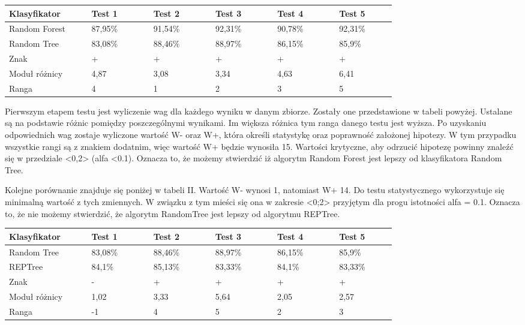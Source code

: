 \documentclass[conference]{IEEEtran}
\begin{document}
\begin{table}[H]

	\begin{tabular}{|p{0.16\linewidth}|p{0.12\linewidth}|p{0.12\linewidth}|p{0.12\linewidth}|p{0.12\linewidth}|p{0.11\linewidth}|}%
	\hline\centering
	Klasyfikator 	& Test 1 & Test 2 & Test 3 & Test 4 & Test 5 \\ \hline\centering
	Random Forest	& 87,95\% & 91,54\% & 92,31\% & 90,78\% & 92,31\% \\ \hline\centering
	Random Tree	& 83,08\% & 88,46\% & 88,97\% & 86,15\% & 85,9\% \\ \hline\centering
	Znak	& + & + & + & + & + \\ \hline\centering
	Moduł różnicy	& 4,87 & 3,08 & 3,34 & 4,63 & 6,41 \\ \hline\centering
	Ranga	& 4 & 1 & 2 & 3 & 5 \\ \hline
	\end{tabular}
\end{table}
Pierwszym etapem testu jest wyliczenie wag dla każdego wyniku w danym zbiorze. Zostały one przedstawione w tabeli powyżej. Ustalane są na podstawie różnic pomiędzy poszczególnymi wynikami. Im większa różnica tym ranga danego testu jest wyższa. Po uzyskaniu odpowiednich wag zostaje wyliczone wartość W- oraz W+, która określi statystykę oraz poprawność założonej hipotezy. W tym przypadku wszystkie rangi są z znakiem dodatnim, więc wartość W+ będzie wynosiła 15. Wartości krytyczne, aby odrzucić hipotezę powinny znaleźć się w przedziale <0,2> (alfa <0.1). Oznacza to, że możemy stwierdzić iż algorytm Random Forest jest lepszy od klasyfikatora Random Tree. 

Kolejne porównanie znajduje się poniżej w tabeli II. Wartość W- wynosi 1, natomiast W+ 14. Do testu statystycznego wykorzystuje się minimalną wartość z tych zmiennych. W związku z tym mieści się ona w zakresie <0;2> przyjętym dla progu istotności alfa = 0.1. Oznacza to, że nie możemy stwierdzić, że algorytm RandomTree jest lepszy od algorytmu REPTree.  

\begin{table}[H]

	\begin{tabular}{|p{0.16\linewidth}|p{0.12\linewidth}|p{0.12\linewidth}|p{0.12\linewidth}|p{0.12\linewidth}|p{0.11\linewidth}|}%
	\hline\centering
	Klasyfikator 	& Test 1 & Test 2 & Test 3 & Test 4 & Test 5 \\ \hline\centering
	Random Tree	& 83,08\% & 88,46\% & 88,97\% & 86,15\% & 85,9\% \\ \hline\centering
	REPTree	& 84,1\% & 85,13\% & 83,33\% & 84,1\% & 83,33\% \\ \hline\centering
	Znak	& - & + & + & + & + \\ \hline\centering
	Moduł różnicy  & 1,02 & 3,33 & 5,64 & 2,05 & 2,57  \\ \hline\centering
	Ranga	& -1 & 4 & 5 & 2 & 3 \\ \hline
	\end{tabular}
\end{table} 
\end{document}
